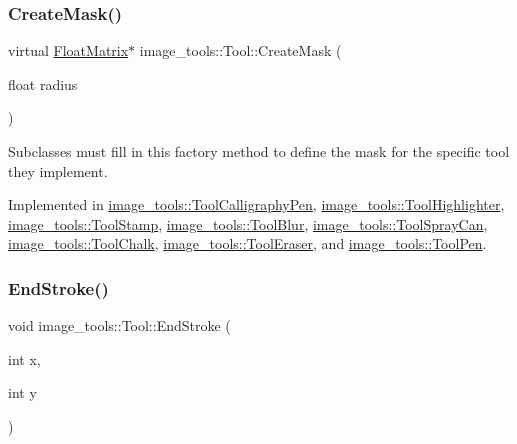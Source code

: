 \subsubsection{\texorpdfstring{Create\+Mask()}{CreateMask()}}
{\footnotesize\ttfamily virtual \hyperlink{classimage__tools_1_1FloatMatrix}{Float\+Matrix}$\ast$ image\+\_\+tools\+::\+Tool\+::\+Create\+Mask (\begin{DoxyParamCaption}\item[{float}]{radius }\end{DoxyParamCaption})\hspace{0.3cm}{\ttfamily [pure virtual]}}

Subclasses must fill in this factory method to define the mask for the specific tool they implement. 

Implemented in \hyperlink{classimage__tools_1_1ToolCalligraphyPen_a02a5785e1fabcc142a03509ac50dfb94}{image\+\_\+tools\+::\+Tool\+Calligraphy\+Pen}, \hyperlink{classimage__tools_1_1ToolHighlighter_a8c5c4f6c91fc49a89c1d24bdc2b3ea70}{image\+\_\+tools\+::\+Tool\+Highlighter}, \hyperlink{classimage__tools_1_1ToolStamp_a1331846ac4bcfc7aa307cf966658d056}{image\+\_\+tools\+::\+Tool\+Stamp}, \hyperlink{classimage__tools_1_1ToolBlur_a75690cef3c70c2f8db56b7106d7cd08c}{image\+\_\+tools\+::\+Tool\+Blur}, \hyperlink{classimage__tools_1_1ToolSprayCan_acac77013717667f64c9ffaedf621b553}{image\+\_\+tools\+::\+Tool\+Spray\+Can}, \hyperlink{classimage__tools_1_1ToolChalk_ac5b2bd1d685a80ae4b296defcbc80580}{image\+\_\+tools\+::\+Tool\+Chalk}, \hyperlink{classimage__tools_1_1ToolEraser_a5720244391587679acb8645a3fbd3d63}{image\+\_\+tools\+::\+Tool\+Eraser}, and \hyperlink{classimage__tools_1_1ToolPen_a27237b8843c611f80f59f8c00de4c835}{image\+\_\+tools\+::\+Tool\+Pen}.

\mbox{\label{classimage__tools_1_1Tool_aa76f5cae95ea7cdc30b067b84857a0f5}} 
\subsubsection{\texorpdfstring{End\+Stroke()}{EndStroke()}}
{\footnotesize\ttfamily void image\+\_\+tools\+::\+Tool\+::\+End\+Stroke (\begin{DoxyParamCaption}\item[{int}]{x,  }\item[{int}]{y }\end{DoxyParamCaption})}

